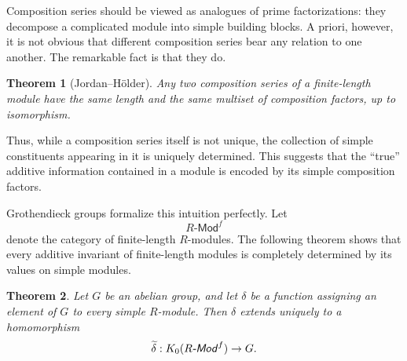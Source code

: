 \documentclass[12pt,reqno]{amsart}
\theoremstyle{plain}
\numberwithin{equation}{section}
\newtheorem{theorem}{Theorem}[section]
\begin{document}
Composition series should be viewed as analogues of prime factorizations: they decompose a complicated module into simple building blocks. A priori, however, it is not obvious that different composition series bear any relation to one another. The remarkable fact is that they do.

\begin{theorem}[Jordan--H\"older]
Any two composition series of a finite-length module have the same length and the same multiset of composition factors, up to isomorphism.
\end{theorem}

Thus, while a composition series itself is not unique, the collection of simple constituents appearing in it is uniquely determined. This suggests that the ``true'' additive information contained in a module is encoded by its simple composition factors.

Grothendieck groups formalize this intuition perfectly. Let
\[
R\textsf{-Mod}^f
\]
denote the category of finite-length $R$-modules.
The following theorem shows that every additive invariant of finite-length modules is completely determined by its values on simple modules.

\begin{theorem}\label{thm: uprop Jordan-Holder}
Let $G$ be an abelian group, and let $\delta$ be a function assigning an element of $G$ to every simple $R$-module. Then $\delta$ extends uniquely to a homomorphism
\[
\widetilde{\delta}:
K_0(R\textsf{\emph{-Mod}}^f)\to G.
\]
\end{theorem}
\end{document}
